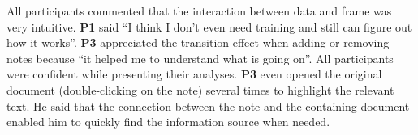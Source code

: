 All participants commented that the interaction between data and frame was very intuitive. \textbf{P1} said ``I think I don't even need training and still can figure out how it works''. \textbf{P3} appreciated the transition effect when adding or removing notes because ``it helped me to understand what is going on''. All participants were confident while presenting their analyses. \textbf{P3} even opened the original document (double-clicking on the note) several times to highlight the relevant text. He said that the connection between the note and the containing document enabled him to quickly find the information source when needed.